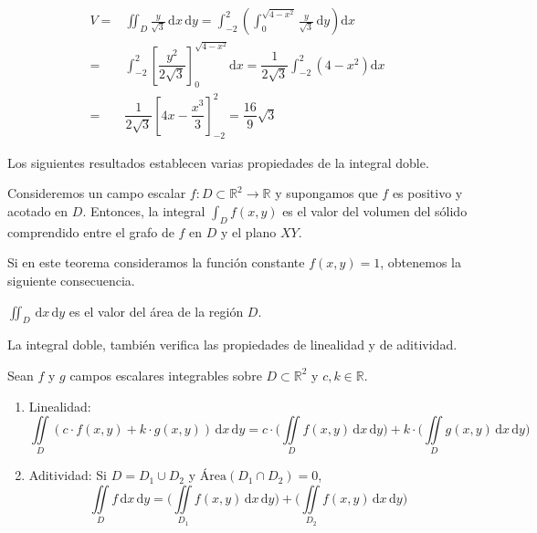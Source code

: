 \begin{ejemplo}
\begin{align*}
V=&\iint_{\mathit D} \frac{y}{\sqrt3}\,\mathrm dx\,\mathrm dy 
= \int_{-2}^2 \left(\int_0^{\sqrt{4-x^2}} \frac{y}{\sqrt3}\,\mathrm dy\right)\mathrm dx \\
=&\int_{-2}^2 \left[\dfrac{y^2}{2\sqrt3} \right]_0^{\sqrt{4-x^2}}\mathrm dx
= \dfrac{1}{2\sqrt3} \int_{-2}^2  (4-x^2)\mathrm dx\\
= &\dfrac{1}{2\sqrt3} \left[4x-\dfrac{x^3}3\right]_{-2}^2 = \dfrac{16}9\sqrt3\tag*{\fej}
\end{align*}
\end{ejemplo}

Los siguientes resultados establecen varias propiedades de la integral doble.
%
\begin{teorema}
Consideremos un campo escalar $f\colon \mathit{D}\subset\mathbb{R}^2\to \mathbb{R}$ y
supongamos que $f$ es positivo y acotado en $\mathit{D}$.
Entonces, la integral $\int_{\mathit{D}} f(x,y)$ es el valor del volumen del sólido comprendido entre el grafo de $f$ en $\mathit{D}$ y el plano $XY$.
\end{teorema}

Si en este teorema consideramos la función constante $f(x,y)=1$, obtenemos la siguiente consecuencia.

\begin{corolario}\label{cor:areaplana}
$\displaystyle\iint_{\mathit{D}}\,\mathrm dx\,\mathrm dy$ es el valor del área de la región $\mathit D$.
\end{corolario}

La integral doble, también verifica las propiedades de linealidad y de aditividad.

\begin{teorema} Sean $f$ y $g$ campos escalares integrables sobre $\mathit D\subset\mathbb{R}^2$ y
$c,k\in\mathbb{R}$.
\begin{enumerate}
\item Linealidad:
\[\displaystyle\iint\limits_{\mathit D} (c\cdot f(x,y)+k\cdot g(x,y))\,\mathrm dx\,\mathrm dy = c\cdot\Bigg(\iint\limits_{\mathit D} f(x,y)\,\mathrm dx\,\mathrm dy\Bigg)+k\cdot\Bigg(\iint\limits_{\mathit D} g(x,y)\,\mathrm dx\,\mathrm dy\Bigg)
\]
\item Aditividad: Si ${\mathit D}=D_1\cup D_2$ y $\textrm{Área}(D_1\cap D_2) = 0$,
\[
\iint\limits_{\mathit D} f\,\mathrm dx\,\mathrm dy = \Bigg(\iint\limits_{D_1} f(x,y)\,\mathrm dx\,\mathrm dy\Bigg)+\Bigg(\iint\limits_{D_2} f(x,y)\,\mathrm dx\,\mathrm dy\Bigg)
\]
\end{enumerate}
\end{teorema}

